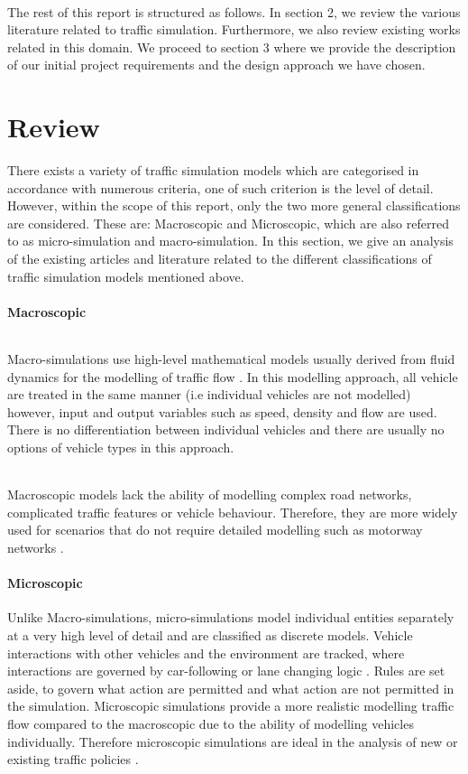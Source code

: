 \documentclass[a4paper,11pt,titlepage]{article}
\begin{document}
\paragraph{}
The rest of this report is structured as follows. In section 2, we review the various literature related to traffic simulation. Furthermore, we also review existing works related in this domain. We proceed to section 3 where we provide the description of our initial project requirements  and the design approach we have chosen.

\part{Review}
There exists a variety of traffic simulation models which are categorised in accordance with numerous criteria, one of such criterion is the level of detail. However, within the scope of this report, only the two more  general classifications are considered. These are: Macroscopic and Microscopic, which are also referred to as micro-simulation and macro-simulation. In this section, we give an analysis of the existing articles and literature related to the different classifications of traffic simulation models mentioned above.
\subsection{Macroscopic}
\paragraph{}
Macro-simulations use high-level mathematical models usually derived from fluid dynamics for the modelling of traffic flow \cite{Ali, Serge}.
In this modelling approach, all vehicle are treated in the same manner (i.e individual vehicles are not modelled) however, input and output variables such as speed, density and flow are used. There is no differentiation between individual vehicles and there are usually no options of vehicle types in this approach.
\paragraph{}
Macroscopic models lack the ability of modelling complex road networks, complicated traffic features or vehicle behaviour. Therefore, they are more widely used for scenarios that do not require detailed modelling such as motorway networks \cite{Schulze}.
\subsection{Microscopic}
Unlike Macro-simulations, micro-simulations model individual entities separately at a very high level of detail and are classified as discrete models. Vehicle interactions with other vehicles and the environment are tracked, where interactions are governed by car-following or lane changing logic \cite{Ali}. Rules are set aside, to govern what action are permitted and what action are not permitted in the simulation. Microscopic simulations provide a more realistic modelling  traffic flow compared to the macroscopic due to the ability of modelling vehicles individually. Therefore microscopic simulations are ideal in the analysis of new or existing traffic policies \cite{Ali, Femke}.
\end{document}
